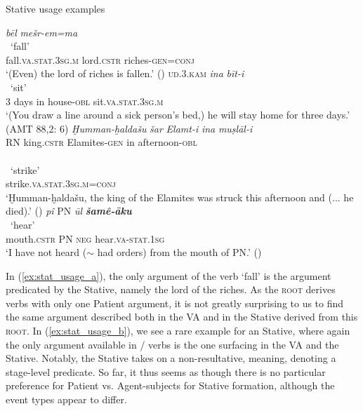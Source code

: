 \documentclass[output=paper,colorlinks,citecolor=brown]{langscibook}
\begin{document}
\begin{exe}  \ex Stative usage examples\label{ex:stative_usage_ex}
\begin{xlist}
    \ex \label{ex:stat_usage_a} \glll \textbf{} \textit{bēl} \textit{mešr-em=ma}\\
    ~`fall' {} {}\\
    fall.\textsc{va}.\textsc{stat.3sg.m} lord.\textsc{cstr} riches-\textsc{gen=conj}\\
    \glt `(Even) the lord of riches is fallen.' ()
       \ex \label{ex:stat_usage_b} \glll \textsc{ud.3.kam} \textit{ina} \textit{bīt-i} \textbf{}\\
       {} {} {} ~`sit'\\
   {3 days} in house-\textsc{obl} 
   sit.\textsc{va}.\textsc{stat.3sg.m}\\
    \glt `(You draw a line around a sick person's bed,) he will stay home for three days.' (AMT 88,2: 6)
       \ex \label{ex:stat_usage_c} \gll \textit{Ḫumman-ḫaldašu} \textit{šar} \textit{Elamt-i} \textit{ina} \textit{muṣlāl-i} \\
   RN king.\textsc{cstr} Elamites-\textsc{gen} in afternoon-\textsc{obl}\\
   \\
       ~`strike'\\
   strike.\textsc{va}.\textsc{stat.3sg.m=conj}\\
    \glt `Ḫumman-ḫaldašu, the king of the Elamites was struck this afternoon and (... he died).' ()
       \ex \label{ex:stat_usage_d} \glll  \textit{pî} PN \textit{ūl} \textit{\textbf{šamê-āku}} \\
       {} {} {} ~`hear'\\
    mouth.\textsc{cstr} PN \textsc{neg} hear.\textsc{va}-\textsc{stat.1sg}\\
    \glt `I have not heard ($\sim$ had orders) from the mouth of PN.' ()
        \end{xlist}
\end{exe}

 In (\ref{ex:stat_usage_a}), the only argument of the  verb `fall' is the argument predicated by the Stative, namely the lord of the riches. As the \textsc{root} derives verbs with only one Patient argument, it is not greatly surprising to us to find the same argument described both in the VA and in the Stative derived from this \textsc{root}. In (\ref{ex:stat_usage_b}), we see a rare example for an  Stative, where again the only argument available in / verbs is the one surfacing in the VA and the Stative. Notably, the Stative takes on a non-resultative,  meaning, denoting a stage-level predicate. So far, it thus seems as though there is no particular preference for Patient vs. Agent-subjects for Stative formation, although the event types appear to differ. 
\end{document}
